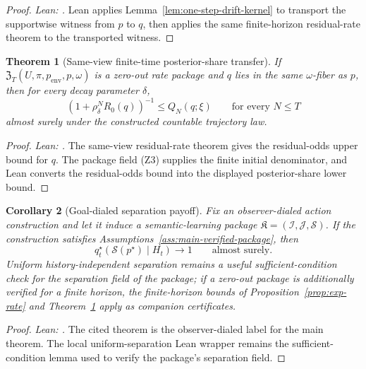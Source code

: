 \documentclass[11pt]{article}
\newtheorem{theorem}{Theorem}[section]
\newtheorem{corollary}[theorem]{Corollary}
\theoremstyle{definition}
\theoremstyle{remark}
\theoremstyle{plain}
\theoremstyle{definition}
\newcommand{\Scal}{\mathcal{S}}
\begin{document}
\begin{proof}
\noindent\emph{Lean: .}
Lean applies Lemma~\ref{lem:one-step-drift-kernel} to transport the supportwise witness from $p$ to $q$, then applies the same finite-horizon residual-rate theorem to the transported witness.
\end{proof}

\begin{theorem}[Same-view finite-time posterior-share transfer]
\label{thm:exp-rate-concentration}
If $\mathfrak Z_T(U,\pi,p_{\mathrm{env}},p,\omega)$ is a zero-out rate package and $q$ lies in the same $\omega$-fiber as $p$, then for every decay parameter $\delta$,
\[
\left(1+\rho_\delta^N R_0(q)\right)^{-1}
\le
Q_N(q;\xi)
\qquad
\text{for every }N\le T
\]
almost surely under the constructed countable trajectory law.
\end{theorem}

\begin{proof}
\noindent\emph{Lean: .}
The same-view residual-rate theorem gives the residual-odds upper bound for $q$. The package field \textup{(Z3)} supplies the finite initial denominator, and Lean converts the residual-odds bound into the displayed posterior-share lower bound.
\end{proof}

\begin{corollary}[Goal-dialed separation payoff]
\label{cor:goal-dialed-payoff}
Fix an observer-dialed action construction and let it induce a semantic-learning package $\mathfrak K=(\mathcal I,\mathcal J,\Scal)$. If the construction satisfies Assumptions~\ref{ass:main-verified-package}, then
\[
q_t^\star(\Scal(p^\star)\mid H_t)\to1
\qquad
\text{almost surely.}
\]
Uniform history-independent separation remains a useful sufficient-condition check for the separation field of the package; if a zero-out package is additionally verified for a finite horizon, the finite-horizon bounds of Proposition~\ref{prop:exp-rate} and Theorem~\ref{thm:exp-rate-concentration} apply as companion certificates.
\end{corollary}

\begin{proof}
\noindent\emph{Lean: .}
The cited theorem is the observer-dialed label for the main theorem. The local uniform-separation Lean wrapper  remains the sufficient-condition lemma used to verify the package's separation field.
\end{proof}
\end{document}
